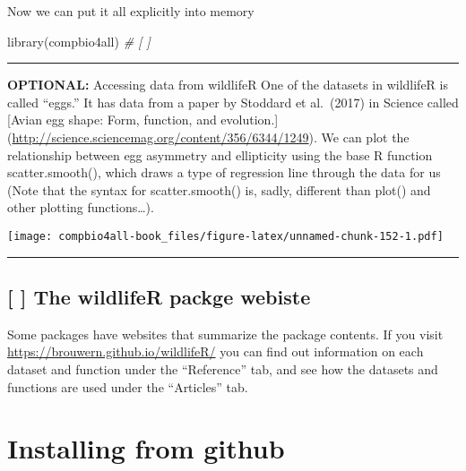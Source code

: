 \documentclass[
]{book}
\newenvironment{Shaded}{\begin{snugshade}}{\end{snugshade}}
\newcommand{\CommentTok}[1]{\textcolor[rgb]{0.56,0.35,0.01}{\textit{#1}}}
\newcommand{\FunctionTok}[1]{\textcolor[rgb]{0.00,0.00,0.00}{#1}}
\newcommand{\NormalTok}[1]{#1}
\newcommand{\SpecialCharTok}[1]{\textcolor[rgb]{0.00,0.00,0.00}{#1}}
\begin{document}
Now we can put it all explicitly into memory

\begin{Shaded}
\begin{Highlighting}[]
\FunctionTok{library}\NormalTok{(compbio4all) }\CommentTok{\# [ ] }
\end{Highlighting}
\end{Shaded}

\begin{center}\rule{0.5\linewidth}{0.5pt}\end{center}

\textbf{OPTIONAL:} Accessing data from wildlifeR
One of the datasets in wildlifeR is called ``eggs.'' It has data from a paper by Stoddard et al.~(2017) in Science called {[}Avian egg shape: Form, function, and evolution.{]} (\url{http://science.sciencemag.org/content/356/6344/1249}). We can plot the relationship between egg asymmetry and ellipticity using the base R function scatter.smooth(), which draws a type of regression line through the data for us (Note that the syntax for scatter.smooth() is, sadly, different than plot() and other plotting functions\ldots).

\begin{Shaded}
\end{Shaded}

\texttt{[image: compbio4all-book\_files/figure-latex/unnamed-chunk-152-1.pdf]}

\begin{center}\rule{0.5\linewidth}{0.5pt}\end{center}

\hypertarget{the-wildlifer-packge-webiste}{%
\section{{[} {]} The wildlifeR packge webiste}\label{the-wildlifer-packge-webiste}}

Some packages have websites that summarize the package contents. If you visit \url{https://brouwern.github.io/wildlifeR/} you can find out information on each dataset and function under the ``Reference'' tab, and see how the datasets and functions are used under the ``Articles'' tab.

\hypertarget{installing-from-github}{%
\chapter{Installing from github}\label{installing-from-github}}
\end{document}
